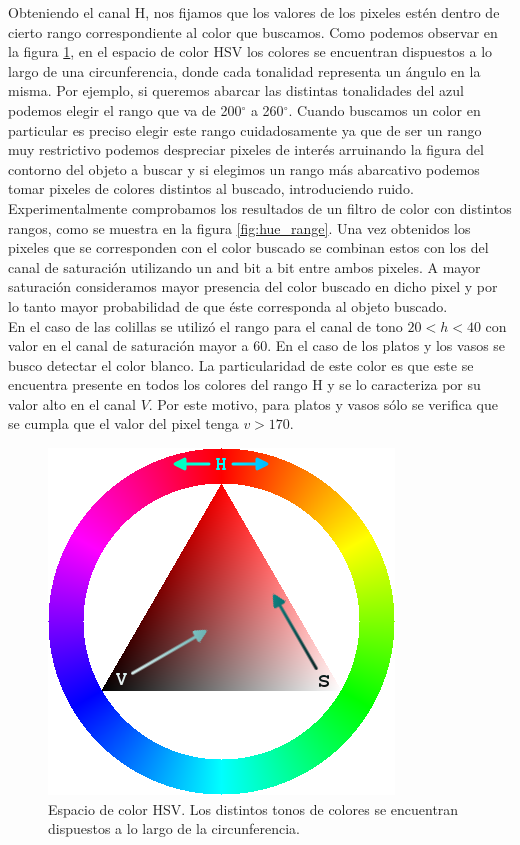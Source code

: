 Obteniendo el canal H, nos fijamos que los valores de los pixeles 
est\'en dentro de cierto rango correspondiente al color que buscamos. 
Como podemos observar en la figura \ref{fig:hsv_space}, en el espacio 
de color HSV los colores se encuentran dispuestos a lo largo de una 
circunferencia, donde cada tonalidad representa un \'angulo en la misma. 
Por ejemplo, si queremos abarcar las distintas tonalidades del azul 
podemos elegir el rango que va de 200$^\circ$ a 260$^\circ$. Cuando 
buscamos un color en particular  es preciso elegir este rango 
cuidadosamente ya que de ser un rango muy restrictivo podemos 
despreciar pixeles de inter\'es arruinando la figura del contorno del 
objeto a buscar y si elegimos un rango m\'as abarcativo podemos tomar 
pixeles de colores distintos al buscado, introduciendo ruido. 
Experimentalmente comprobamos los resultados de un filtro de color con 
distintos rangos, como se muestra  en la figura \ref{fig:hue_range}. 
Una vez obtenidos los pixeles que se corresponden con el color buscado 
se combinan estos con los del canal de saturaci\'on utilizando un and 
bit a bit entre ambos pixeles. A mayor saturaci\'on consideramos mayor 
presencia del color buscado en dicho pixel y por lo tanto mayor 
probabilidad de que \'este corresponda al objeto buscado. \\
\indent En el caso de las colillas se utiliz\'o el rango para el canal de tono 
$20<h<40$ con valor en el canal de saturaci\'on mayor a 60. En el caso 
de los platos y los vasos se busco detectar el color blanco. La 
particularidad de este color es que este se encuentra presente en 
todos los colores del rango H y se lo caracteriza por su valor alto en 
el canal $V$. Por este motivo, para platos y vasos s\'olo se verifica que 
se cumpla que el valor del pixel tenga $v>170$.
\begin{figure}[tpb]
\begin{center}
  \includegraphics[scale=0.4]{vision/figures/hsv_triangle.png}
\end{center}
  \caption[Espacio de color HSV]{\small Espacio de color HSV. Los distintos tonos de colores se encuentran dispuestos a lo largo de la circunferencia.}
  \label{fig:hsv_space}
\end{figure}

